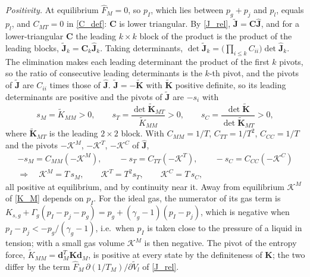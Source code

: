 \emph{Positivity.} At equilibrium $\hat{F}_M=0$, so $p_I$, which lies between $p_g+p_{j}$ and $p_l$, equals $p_l$, and $C_{MT}=0$ in \eqref{C_def}: $\boldsymbol{C}$ is lower triangular. By \eqref{J_rel}, $\tilde{\boldsymbol{J}}=\boldsymbol{C}\hat{\boldsymbol{J}}$, and for a lower-triangular $\boldsymbol{C}$ the leading $k\times k$ block of the product is the product of the leading blocks, $\tilde{\boldsymbol{J}}_k=\boldsymbol{C}_k\hat{\boldsymbol{J}}_k$. Taking determinants, $\det\tilde{\boldsymbol{J}}_k=\bigl(\prod_{i\le k}C_{ii}\bigr)\det\hat{\boldsymbol{J}}_k$. The elimination makes each leading determinant the product of the first $k$ pivots, so the ratio of consecutive leading determinants is the $k$-th pivot, and the pivots of $\tilde{\boldsymbol{J}}$ are $C_{ii}$ times those of $\hat{\boldsymbol{J}}$. $\tilde{\boldsymbol{J}}=-\tilde{\boldsymbol{K}}$ with $\tilde{\boldsymbol{K}}$ positive definite, so its leading determinants are positive and the pivots of $\tilde{\boldsymbol{J}}$ are $-s_i$ with
\begin{equation}\label{pivots}
s_M=\tilde{K}_{MM}>0,\qquad s_T=\frac{\det\tilde{\boldsymbol{K}}_{MT}}{\tilde{K}_{MM}}>0,\qquad s_C=\frac{\det\tilde{\boldsymbol{K}}}{\det\tilde{\boldsymbol{K}}_{MT}}>0,
\end{equation}
where $\tilde{\boldsymbol{K}}_{MT}$ is the leading $2\times2$ block. With $C_{MM}=1/T$, $C_{TT}=1/T^2$, $C_{CC}=1/T$ and the pivots $-\mathcal{K}^M$, $-\mathcal{K}^T$, $-\mathcal{K}^C$ of $\hat{\boldsymbol{J}}$,
\begin{equation}\label{pivot_K}
\begin{gathered}
-s_M=C_{MM}(-\mathcal{K}^M),\qquad -s_T=C_{TT}(-\mathcal{K}^T),\qquad -s_C=C_{CC}(-\mathcal{K}^C)\\
\Longrightarrow\quad\mathcal{K}^M=T\,s_M,\qquad \mathcal{K}^T=T^2s_T,\qquad \mathcal{K}^C=T\,s_C,
\end{gathered}
\end{equation}
all positive at equilibrium, and by continuity near it. Away from equilibrium $\mathcal{K}^M$ of \eqref{K_M} depends on $p_I$. For the ideal gas, the numerator of its gas term is $K_{s,g}+\Gamma_g(p_I-p_{j}-p_g)=p_g+(\gamma_g-1)(p_I-p_{j})$, which is negative when $p_I-p_{j}<-p_g/(\gamma_g-1)$, i.e.\ when $p_I$ is taken close to the pressure of a liquid in tension; with a small gas volume $\mathcal{K}^M$ is then negative. The pivot of the entropy force, $\tilde K_{MM}=\boldsymbol{d}_M^T\boldsymbol{K}\boldsymbol{d}_M$, is positive at every state by the definiteness of $\boldsymbol{K}$; the two differ by the term $\hat{F}_M\,\partial(1/T_M)/\partial\tilde V_l$ of \eqref{J_rel}.

